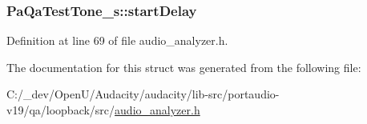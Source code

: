 \subsubsection[{\texorpdfstring{start\+Delay}{startDelay}}]{ Pa\+Qa\+Test\+Tone\+\_\+s\+::start\+Delay}\hypertarget{struct_pa_qa_test_tone__s_a094a7dd30970e8def532ac7ea38f6b31}{}\label{struct_pa_qa_test_tone__s_a094a7dd30970e8def532ac7ea38f6b31}


Definition at line 69 of file audio\+\_\+analyzer.\+h.



The documentation for this struct was generated from the following file\+:\begin{DoxyCompactItemize}
\item 
C\+:/\+\_\+dev/\+Open\+U/\+Audacity/audacity/lib-\/src/portaudio-\/v19/qa/loopback/src/\hyperlink{audio__analyzer_8h}{audio\+\_\+analyzer.\+h}\end{DoxyCompactItemize}
